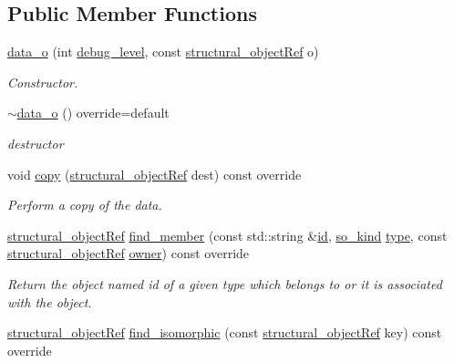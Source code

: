 \subsection*{Public Member Functions}
\begin{DoxyCompactItemize}
\item 
\hyperlink{classdata__o_a574a6c6a5f9c712ddd3e29504434b812}{data\+\_\+o} (int \hyperlink{classstructural__object_ac2744292aa7f0fca3742133d16bb3201}{debug\+\_\+level}, const \hyperlink{structural__objects_8hpp_a8ea5f8cc50ab8f4c31e2751074ff60b2}{structural\+\_\+object\+Ref} o)
\begin{DoxyCompactList}\small\item\em Constructor. \end{DoxyCompactList}\item 
\hyperlink{classdata__o_ac6f737b19c2d43490ecb499782b9951a}{$\sim$data\+\_\+o} () override=default
\begin{DoxyCompactList}\small\item\em destructor \end{DoxyCompactList}\item 
void \hyperlink{classdata__o_a63d272f750a9374710c1bc8a8d06e83c}{copy} (\hyperlink{structural__objects_8hpp_a8ea5f8cc50ab8f4c31e2751074ff60b2}{structural\+\_\+object\+Ref} dest) const override
\begin{DoxyCompactList}\small\item\em Perform a copy of the data. \end{DoxyCompactList}\item 
\hyperlink{structural__objects_8hpp_a8ea5f8cc50ab8f4c31e2751074ff60b2}{structural\+\_\+object\+Ref} \hyperlink{classdata__o_a3167463ed559dd8d06901168aa3ea846}{find\+\_\+member} (const std\+::string \&\hyperlink{classstructural__object_a841a75f6e349ff7c1987dc92d4ac33a6}{id}, \hyperlink{structural__objects_8hpp_acf52399aecacb7952e414c5746ce6439}{so\+\_\+kind} \hyperlink{classstructural__object_a9a7159ce4c8da9984f256d9032f49778}{type}, const \hyperlink{structural__objects_8hpp_a8ea5f8cc50ab8f4c31e2751074ff60b2}{structural\+\_\+object\+Ref} \hyperlink{classstructural__object_a3e96b3e00b8a78adfc44872d82e186ea}{owner}) const override
\begin{DoxyCompactList}\small\item\em Return the object named id of a given type which belongs to or it is associated with the object. \end{DoxyCompactList}\item 
\hyperlink{structural__objects_8hpp_a8ea5f8cc50ab8f4c31e2751074ff60b2}{structural\+\_\+object\+Ref} \hyperlink{classdata__o_a6e9d672d84085462c777887ab7c57763}{find\+\_\+isomorphic} (const \hyperlink{structural__objects_8hpp_a8ea5f8cc50ab8f4c31e2751074ff60b2}{structural\+\_\+object\+Ref} key) const override

\end{DoxyCompactItemize}
